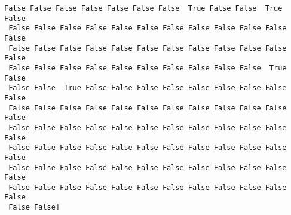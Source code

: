 \documentclass[11pt]{article}
\begin{document}
\begin{Verbatim}[commandchars=\\\{\}]
 False False False False False False False  True False False  True False
 False False False False False False False False False False False False
 False False False False False False False False False False False False
 False False False False False False False False False False  True False
 False False  True False False False False False False False False False
 False False False False False False False False False False False False
 False False False False False False False False False False False False
 False False False False False False False False False False False False
 False False False False False False False False False False False False
 False False False False False False False False False False False False
 False False]

    \end{Verbatim}


    
    
    
    
\end{document}
